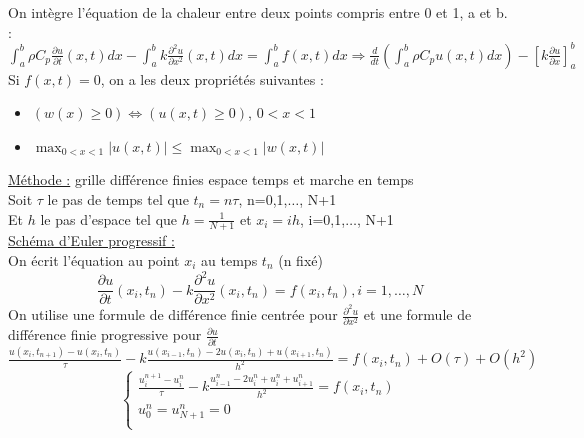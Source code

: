 \documentclass[../main.tex]{subfiles}
\begin{document}
On intègre l'équation de la chaleur entre deux points compris entre 0 et 1, a et b. : $\int_a^b \rho C_p \frac{\partial u}{\partial t}(x,t)dx-\int_a^b k\frac{\partial^2u}{\partial x^2}(x,t)dx=\int_a^b f(x,t)dx \Rightarrow \frac{d}{dt}(\int_a^b \rho C_p u(x,t)dx)-[k\frac{\partial u}{\partial x}]_a^b$\\

Si $f(x,t)=0$, on a les deux propriétés suivantes : \begin{itemize}
    \item $(w(x)\geq 0) \Leftrightarrow (u(x,t) \geq 0)$, $0<x<1$\\
    \item $\max_{0<x<1} \lvert u(x,t)\rvert \leq \max_{0<x<1} \lvert w(x,t)\rvert$\\
\end{itemize}

\underline{Méthode :} grille différence finies espace temps et marche en temps\\

Soit $\tau$ le pas de temps tel que $t_n = n \tau$, n=0,1,$\dots$, N+1\\
Et $h$ le pas d'espace tel que $h = \frac{1}{N+1}$ et $x_i = ih$, i=0,1,$\dots$, N+1\\

\quad \underline{Schéma d'Euler progressif :}\\
On écrit l'équation au point $x_i$ au temps $t_n$ (n fixé)\\
\begin{equation}
    \frac{\partial u}{\partial t}(x_i,t_n)-k \frac{\partial^2 u}{\partial x^2}(x_i,t_n) = f(x_i,t_n), i=1,\dots,N
\end{equation}
On utilise une formule de différence finie centrée pour $\frac{\partial^2 u}{\partial x^2}$ et une formule de différence finie progressive pour $\frac{\partial u}{\partial t}$\\

$\frac{u(x_i,t_{n+1})-u(x_i,t_n)}{\tau} - k\frac{u(x_{i-1},t_n)-2u(x_i,t_n)+u(x_{i+1},t_n)}{h^2} = f(x_i,t_n)+O(\tau)+O(h^2)$\\

\begin{equation}
    \begin{cases}
        \frac{u_i^{n+1}-u_i^n}{\tau}-k \frac{u_{i-1}^n-2u_i^n+u_i^n+u_{i+1}^n}{h^2} = f(x_i,t_n)\\
        u_0^n = u_{N+1}^n = 0\\
    \end{cases}
\end{equation}
\end{document}
